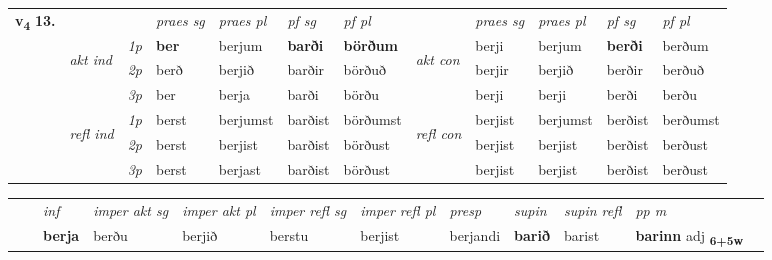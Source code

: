 \begin{tabular}{llllllllllll} \toprule
\multirow{4}{*}{{{\textbf{v{\textsubscript{4}}} \Large{\textbf{13.}}}}}  & &   &  \textit{praes sg}  & \textit{praes pl}  &\textit{ pf sg} & \textit{pf pl} &  &  \textit{praes sg}  & \textit{praes pl}  & \textit{pf sg} & \textit{pf pl } \\*
	\cmidrule{4-7} \cmidrule{9-12}
 & \multirow{3}{*}{\begin{turn}{90}\textit{akt ind}\end{turn}} & {\textit{1p}} & \textbf{ber} & berjum    & \textbf{barði} & \textbf{börðum} & \multirow{3}{*}{\begin{turn}{90}\textit{akt con}\end{turn}} &berji & berjum & \textbf{berði} & berðum\\*
& &  {\textit{2p}} &  berð  & berjið   & barðir & börðuð & & berjir & berjið & berðir & berðuð \\*
& &  {\textit{3p}} & ber & berja   & barði & börðu & & berji & berji& berði & berðu  \\*
\cmidrule{4-7} \cmidrule{9-12}
 &\multirow{3}{*}{\begin{turn}{90}\textit{refl ind}\end{turn}} & {\textit{1p}} & berst & berjumst    & barðist & börðumst & \multirow{3}{*}{\begin{turn}{90}\textit{refl con}\end{turn}}  &berjist & berjumst & berðist & berðumst\\*
 &&  {\textit{2p}} &  berst  & berjist   & barðist & börðust & &berjist & berjist & berðist & berðust \\*
& &  {\textit{3p}} & berst & berjast   & barðist & börðust & & berjist & berjist& berðist & berðust  \\*
\cmidrule{4-7} \cmidrule{9-12}
\end{tabular}


\begin{tabular}{llllllllllll}
 & & \textit{inf} & \textit{imper akt sg} & \textit{imper akt pl} & \textit{imper refl sg} & \textit{imper refl pl} & \textit{presp} & \textit{supin} & \textit{supin refl} & \textit{pp m}     \\*
  & & \textbf{berja} & berðu  & berjið & berstu & berjist & berjandi &  \textbf{barið} & barist & \textbf{barinn} adj \textbf{\textsubscript{6+5w}} \\*
\cmidrule{1-12}
\end{tabular}



